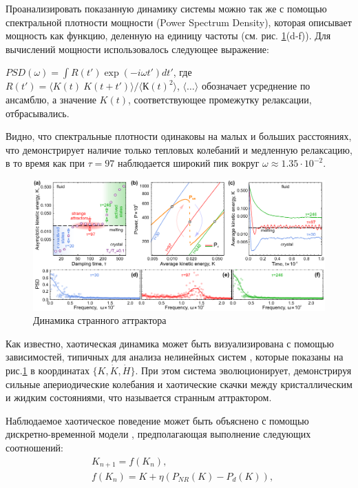 Проанализировать показанную динамику системы можно так же с помощью спектральной плотности мощности (Power Spectrum Density), которая описывает мощность как функцию, деленную на 
единицу частоты (см. рис. \ref{DPD-Figure3}(d-f)). Для вычислений мощности использовалось следующее выражение: 

$PSD(\omega) = \int R(t') \exp(-i \omega t') dt'$, где $R(t') = \langle K(t)~K(t + t') \rangle / \langle К(t)^2 \rangle$,
$\langle \dots \rangle$ обозначает усреднение по ансамблю, а значение $K(t)$, соответствующее промежутку релаксации, отбрасывались.

Видно, что спектральные плотности одинаковы на малых и больших расстояниях, что демонстрирует наличие только тепловых колебаний и медленную релаксацию,
в то время как при $\tau = 97$ наблюдается широкий пик вокруг $\omega \approx 1.35  \cdot 10^{-2}$.


\begin{figure}[htbp]
    \centerline{\includegraphics[width=0.95\linewidth]{Ris/DPD-Figure3.pdf}}
    \caption{Динамика странного аттрактора}
    \label{DPD-Figure3}
\end{figure}

Как известно, хаотическая динамика может быть визуализирована с помощью зависимостей, типичных для анализа нелинейных систем \cite{Lichtenberg}, 
которые показаны на рис.\ref{DPD-Figure3} в координатах $\{ K, \dot{K}, \dot{H}\}$. 
При этом система эволюционирует, демонстрируя сильные апериодические колебания и хаотические скачки 
между кристаллическим и жидким состояниями, что называется странным аттрактором. 

Наблюдаемое хаотическое поведение может быть объяснено с помощью дискретно-временной модели \cite{Lichtenberg}, предполагающая выполнение следующих соотношений:
\begin{align} \label{StAttr}
    &K_{n+1} = f(K_n), \\
    &f(K_n) = K + \eta (P_{NR}(K) - P_{d}(K)),
\end{align}


